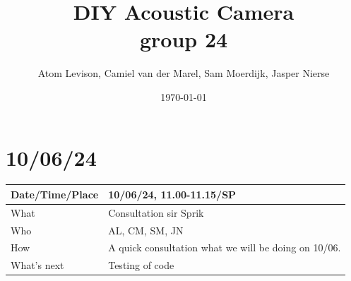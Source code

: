 \documentclass{article}
\title{%
  DIY Acoustic Camera \\
  \Minutes group 24 }
\author{Atom Levison, Camiel van der Marel, Sam Moerdijk, Jasper Nierse}
\date{\today}
\begin{document}
\maketitle

\section{10/06/24}

\begin{table}[H]
\begin{tabular}{|p{1.5in}|p{4in}|}
\hline
Date/Time/Place &  10/06/24, 11.00-11.15/SP\\ \hline
What            &  Consultation sir Sprik\\ \hline
Who             &  AL, CM, SM, JN\\ \hline
How             &  A quick consultation what we will be doing on 10/06.  \\ \hline
What's next     &  Testing of code\\ \hline
\end{tabular}
\end{table}
\end{document}
